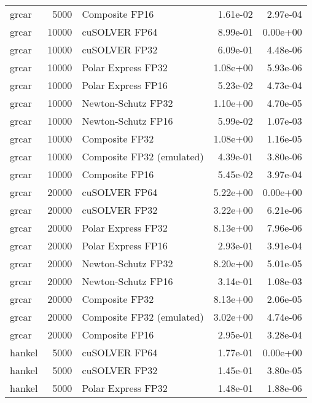 \begin{table}
\begin{tabular}{lrlrr}
    grcar &  5000 &            Composite FP16 &  1.61e-02 &        2.97e-04 \\
    grcar & 10000 &             cuSOLVER FP64 &  8.99e-01 &        0.00e+00 \\
    grcar & 10000 &             cuSOLVER FP32 &  6.09e-01 &        4.48e-06 \\
    grcar & 10000 &        Polar Express FP32 &  1.08e+00 &        5.93e-06 \\
    grcar & 10000 &        Polar Express FP16 &  5.23e-02 &        4.73e-04 \\
    grcar & 10000 &        Newton-Schutz FP32 &  1.10e+00 &        4.70e-05 \\
    grcar & 10000 &        Newton-Schutz FP16 &  5.99e-02 &        1.07e-03 \\
    grcar & 10000 &            Composite FP32 &  1.08e+00 &        1.16e-05 \\
    grcar & 10000 & Composite FP32 (emulated) &  4.39e-01 &        3.80e-06 \\
    grcar & 10000 &            Composite FP16 &  5.45e-02 &        3.97e-04 \\
    grcar & 20000 &             cuSOLVER FP64 &  5.22e+00 &        0.00e+00 \\
    grcar & 20000 &             cuSOLVER FP32 &  3.22e+00 &        6.21e-06 \\
    grcar & 20000 &        Polar Express FP32 &  8.13e+00 &        7.96e-06 \\
    grcar & 20000 &        Polar Express FP16 &  2.93e-01 &        3.91e-04 \\
    grcar & 20000 &        Newton-Schutz FP32 &  8.20e+00 &        5.01e-05 \\
    grcar & 20000 &        Newton-Schutz FP16 &  3.14e-01 &        1.08e-03 \\
    grcar & 20000 &            Composite FP32 &  8.13e+00 &        2.06e-05 \\
    grcar & 20000 & Composite FP32 (emulated) &  3.02e+00 &        4.74e-06 \\
    grcar & 20000 &            Composite FP16 &  2.95e-01 &        3.28e-04 \\
   hankel &  5000 &             cuSOLVER FP64 &  1.77e-01 &        0.00e+00 \\
   hankel &  5000 &             cuSOLVER FP32 &  1.45e-01 &        3.80e-05 \\
   hankel &  5000 &        Polar Express FP32 &  1.48e-01 &        1.88e-06 \\

\end{tabular}
\end{table}
